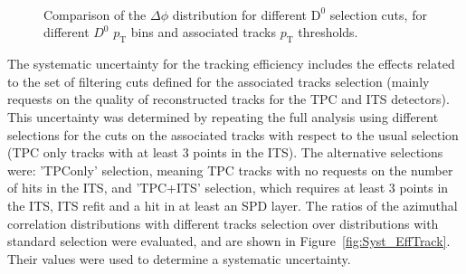 \begin{figure}[h]
\centering
{}
 \\
 \\
 \\
 \caption{Comparison of the $\Delta\phi$ distribution for different $\text{D}^0$ selection cuts, for different $D^0$ $p_\text{T}$ bins and associated tracks $p_\text{T}$ thresholds.}
 \label{fig:Syst_D0CutVar}
\end{figure}


The systematic uncertainty for the tracking efficiency includes the effects related to the set of filtering cuts defined for the associated tracks selection (mainly requests on the quality of reconstructed tracks for the TPC and ITS detectors). This uncertainty was determined by repeating the full analysis using different selections for the cuts on the associated tracks with respect to the usual selection (TPC only tracks with at least 3 points in the ITS). The alternative selections were: 'TPConly' selection, meaning TPC tracks with no requests on the number of hits in the ITS, and 'TPC+ITS' selection, which requires at least 3 points in the ITS, ITS refit and a hit in at least an SPD layer. The ratios of the azimuthal correlation distributions with different tracks selection over distributions with standard selection were evaluated, and are shown in Figure~\ref{fig:Syst_EffTrack}. Their values were used to determine a systematic uncertainty.

